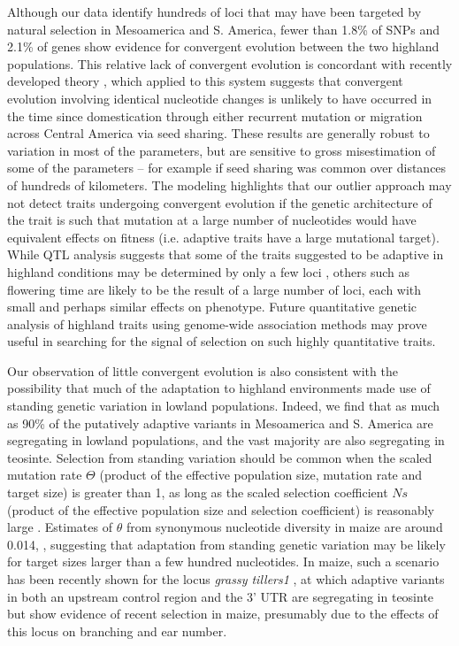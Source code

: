 Although our data identify hundreds of loci that may have been targeted by natural selection in Mesoamerica and S. America, 
fewer than 1.8\% of SNPs and 2.1\% of genes show evidence for convergent evolution between the two highland populations.
This relative lack of convergent evolution is concordant with recently developed theory \citep{ralph2014convergent},
which applied to this system suggests that convergent evolution involving identical nucleotide changes 
is unlikely to have occurred in the time since domestication through either recurrent mutation or migration across Central America via seed sharing.   
These results are generally robust to variation in most of the parameters, but are sensitive to gross misestimation of some of the parameters -- for example if seed sharing was common over distances of hundreds of kilometers.  
The modeling highlights that our outlier approach may not detect traits undergoing convergent evolution 
if the genetic architecture of the trait is such that mutation at a large number of nucleotides would have equivalent effects on fitness 
(i.e. adaptive traits have a large mutational target). 
While QTL analysis suggests that some of the traits suggested to be adaptive in highland conditions may be determined by only a few loci \citep{Lauter_2004_15342532}, 
others such as flowering time \citep{buckler2009genetic} are likely to be the result of a large number of loci, each with small and perhaps similar effects on phenotype.  
Future quantitative genetic analysis of highland traits using genome-wide association methods may prove useful in searching for the signal of selection on such highly quantitative traits. 

Our observation of little convergent evolution is also consistent with the possibility that much of the adaptation to highland environments made use of standing genetic variation in lowland populations. 
Indeed, we find that as much as 90\% of the putatively adaptive variants in Mesoamerica and S. America are segregating in lowland populations, 
and the vast majority are also segregating in teosinte.  
Selection from standing variation should be common when the scaled mutation rate $\Theta$ 
(product of the effective population size, mutation rate and target size) is greater than 1,
as long as the scaled selection coefficient $Ns$ 
(product of the effective population size and selection coefficient) is reasonably large \cite[]{Hermisson_2005_15716498}.
Estimates of $\theta$ from synonymous nucleotide diversity in maize are around 0.014, \citep{Tenaillon_2004_15014173,Wright_2005_15919994,Ross-Ibarra_2009_19153259}, 
suggesting that adaptation from standing genetic variation may be likely for target sizes larger than a few hundred nucleotides.
In maize, such a scenario has been recently shown for the locus \emph{grassy tillers1} \cite[]{Wills_2013_23825971}, at which adaptive variants in both an upstream control region and the 3' UTR are segregating in teosinte but show evidence of recent selection in maize, presumably due to the effects of this locus on branching and ear number.

